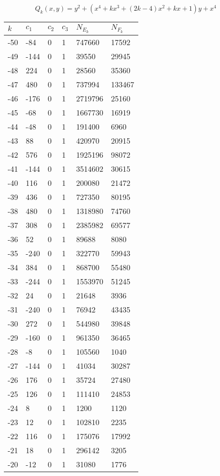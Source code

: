 \documentclass{amsart}
\begin{document}
\clearpage
$$Q_k(x,y)=y^2 + (x^4 + kx^3 + (2k - 4)x^2 + kx + 1)y + x^4$$
\begin{longtable}{llllll}
\hline
$k$ & $c_1$ & $c_2$ & $c_3$ & $N_{E_k}$ & $N_{F_k}$\\
\hline
-50 & -84 & 0 & 1 & 747660 & 17592\\
-49 & -144 & 0 & 1 & 39550 & 29945\\
-48 & 224 & 0 & 1 & 28560 & 35360\\
-47 & 480 & 0 & 1 & 737994 & 133467\\
-46 & -176 & 0 & 1 & 2719796 & 25160\\
-45 & -68 & 0 & 1 & 1667730 & 16919\\
-44 & -48 & 0 & 1 & 191400 & 6960\\
-43 & 88 & 0 & 1 & 420970 & 20915\\
-42 & 576 & 0 & 1 & 1925196 & 98072\\
-41 & -144 & 0 & 1 & 3514602 & 30615\\
-40 & 116 & 0 & 1 & 200080 & 21472\\
-39 & 436 & 0 & 1 & 727350 & 80195\\
-38 & 480 & 0 & 1 & 1318980 & 74760\\
-37 & 308 & 0 & 1 & 2385982 & 69577\\
-36 & 52 & 0 & 1 & 89688 & 8080\\
-35 & -240 & 0 & 1 & 322770 & 59943\\
-34 & 384 & 0 & 1 & 868700 & 55480\\
-33 & -244 & 0 & 1 & 1553970 & 51245\\
-32 & 24 & 0 & 1 & 21648 & 3936\\
-31 & -240 & 0 & 1 & 76942 & 43435\\
-30 & 272 & 0 & 1 & 544980 & 39848\\
-29 & -160 & 0 & 1 & 961350 & 36465\\
-28 & -8 & 0 & 1 & 105560 & 1040\\
-27 & -144 & 0 & 1 & 41034 & 30287\\
-26 & 176 & 0 & 1 & 35724 & 27480\\
-25 & 126 & 0 & 1 & 111410 & 24853\\
-24 & 8 & 0 & 1 & 1200 & 1120\\
-23 & 12 & 0 & 1 & 102810 & 2235\\
-22 & 116 & 0 & 1 & 175076 & 17992\\
-21 & 18 & 0 & 1 & 296142 & 3205\\
-20 & -12 & 0 & 1 & 31080 & 1776\\

\end{longtable}
\end{document}
